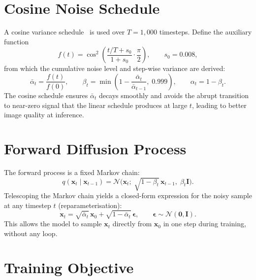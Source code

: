 \documentclass[12pt, a4paper]{report}
\begin{document}
\section{Cosine Noise Schedule}

A cosine variance schedule~\cite{nichol2021improved} is used over $T=1{,}000$ timesteps.
Define the auxiliary function
\[
  f(t) = \cos^2\!\left(\frac{t/T + s_0}{1 + s_0} \cdot \frac{\pi}{2}\right),
  \qquad s_0 = 0.008,
\]
from which the cumulative noise level and step-wise variance are derived:
\[
  \bar{\alpha}_t = \frac{f(t)}{f(0)},
  \qquad
  \beta_t = \min\!\left(1 - \frac{\bar{\alpha}_t}{\bar{\alpha}_{t-1}},\; 0.999\right),
  \qquad
  \alpha_t = 1 - \beta_t.
\]
The cosine schedule ensures $\bar{\alpha}_t$ decays smoothly and avoids the abrupt
transition to near-zero signal that the linear schedule produces at large $t$, leading
to better image quality at inference.

\section{Forward Diffusion Process}

The forward process is a fixed Markov chain:
\[
  q(\mathbf{x}_t \mid \mathbf{x}_{t-1})
    = \mathcal{N}\!\bigl(\mathbf{x}_t;\;
        \sqrt{1-\beta_t}\,\mathbf{x}_{t-1},\; \beta_t\mathbf{I}\bigr).
\]
Telescoping the Markov chain yields a closed-form expression for the
noisy sample at any timestep $t$ (reparameterisation):
\[
  \mathbf{x}_t
    = \sqrt{\bar\alpha_t}\,\mathbf{x}_0
    + \sqrt{1-\bar\alpha_t}\,\boldsymbol\epsilon,
  \qquad
  \boldsymbol\epsilon \sim \mathcal{N}(\mathbf{0},\mathbf{I}).
\]
This allows the model to sample $\mathbf{x}_t$ directly from $\mathbf{x}_0$ in one step
during training, without any loop.

\section{Training Objective}
\end{document}
